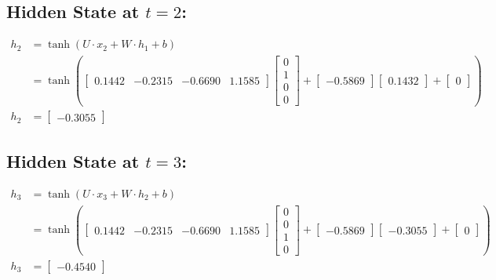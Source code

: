 \documentclass{article}
\begin{document}
\subsection{Hidden State at \(t=2\):}

\begin{align*}
h_2 &= \tanh(U \cdot x_2 + W \cdot h_1 + b) \\
&= \tanh\left(\begin{bmatrix}
0.1442 & -0.2315 & -0.6690 & 1.1585
\end{bmatrix} \begin{bmatrix}
0 \\
1 \\
0 \\
0
\end{bmatrix} + \begin{bmatrix}
-0.5869
\end{bmatrix} \begin{bmatrix}
0.1432
\end{bmatrix} + \begin{bmatrix}
0
\end{bmatrix}\right) \\
h_2 &= \begin{bmatrix}
-0.3055
\end{bmatrix}
\end{align*}

\subsection{Hidden State at \(t=3\):}

\begin{align*}
h_3 &= \tanh(U \cdot x_3 + W \cdot h_2 + b) \\
&= \tanh\left(\begin{bmatrix}
0.1442 & -0.2315 & -0.6690 & 1.1585
\end{bmatrix} \begin{bmatrix}
0 \\
0 \\
1 \\
0
\end{bmatrix} + \begin{bmatrix}
-0.5869
\end{bmatrix} \begin{bmatrix}
-0.3055
\end{bmatrix} + \begin{bmatrix}
0
\end{bmatrix}\right) \\
h_3 &= \begin{bmatrix}
-0.4540
\end{bmatrix}
\end{align*}
\end{document}
